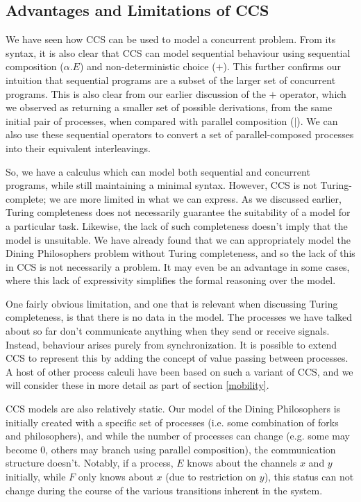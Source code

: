 \subsection{Advantages and Limitations of CCS}

We have seen how CCS can be used to model a concurrent problem.  From
its syntax, it is also clear that CCS can model sequential behaviour
using sequential composition ($\alpha.E$) and non-deterministic choice
($+$).  This further confirms our intuition that sequential programs are
a subset of the larger set of concurrent programs.  This is also clear
from our earlier discussion of the $+$ operator, which we observed as
returning a smaller set of possible derivations, from the same initial
pair of processes, when compared with parallel composition ($|$).  We
can also use these sequential operators to convert a set of
parallel-composed processes into their equivalent interleavings.

So, we have a calculus which can model both sequential and concurrent
programs, while still maintaining a minimal syntax.  However, CCS is not
Turing-complete; we are more limited in what we can express.  As we
discussed earlier, Turing completeness does not necessarily guarantee
the suitability of a model for a particular task. Likewise, the lack of
such completeness doesn't imply that the model is unsuitable.  We have
already found that we can appropriately model the Dining Philosophers
problem without Turing completeness, and so the lack of this in CCS is
not necessarily a problem.  It may even be an advantage in some cases,
where this lack of expressivity simplifies the formal reasoning over the
model.

One fairly obvious limitation, and one that is relevant when discussing
Turing completeness, is that there is no data in the model.  The
processes we have talked about so far don't communicate anything when
they send or receive signals.  Instead, behaviour arises purely from
synchronization.  It is possible to extend CCS to represent this by
adding the concept of value passing between processes.  A host of other
process calculi have been based on such a variant of CCS, and we will
consider these in more detail as part of section \ref{mobility}.

CCS models are also relatively static.  Our model of the Dining
Philosophers is initially created with a specific set of processes
(i.e. some combination of forks and philosophers), and while the number
of processes can change (e.g. some may become $0$, others may branch
using parallel composition), the communication structure doesn't.
Notably, if a process, $E$ knows about the channels $x$ and $y$
initially, while $F$ only knows about $x$ (due to restriction on $y$),
this status can not change during the course of the various transitions
inherent in the system.

